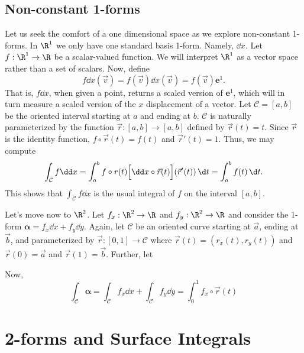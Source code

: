 \subsection{Non-constant 1-forms}

Let us seek the comfort of a one dimensional space as we explore non-constant 1-forms.
In $\R^1$ we only have one standard basis 1-form.  Namely, $\dd x$.
Let $f:\R^1\to\R$ be a scalar-valued function.  We will interpret
$\R^1$ as a vector space rather than a set of scalars. Now, define
\[
	f\dd x (\vec v) = f(\vec v)\dd x(\vec v) = f(\vec v)\bm e^1.
\]
That is, $f\dd x$, when given a point, returns a scaled version of $\bm e^1$,
which will in turn measure a scaled version of the $x$ displacement of
a vector.  Let $\mathcal C=[a,b]$ be the oriented interval starting
at $a$ and ending at $b$.  $\mathcal C$ is naturally parameterized
by the function $\vec r:[a,b]\to[a,b]$ defined by $\vec r(t) = t$.
Since $\vec r$ is the identity function, $f\circ \vec r(t)=f(t)$ and
$\vec r'(t) = 1$.
Thus, we may compute
\[
	\int_{\mathcal C} f\dd x = \int_a^b f\circ r(t) 
	\Big[\dd x \circ \vec r(t)\Big](\vec r'(t))\,\d t
	=\int_a^b f(t)\,\d t.
\]
This shows that
$\int_{\mathcal C} f\dd x$ is the usual integral of $f$ on the interval $[a,b]$.

\bigskip
Let's move now to $\R^2$.  Let $f_x:\R^2\to\R$ and $f_y:\R^2\to\R$
and consider the 1-form $\bm\alpha = f_x\dd x+f_y\dd y$.  Again, let
$\mathcal C$ be an oriented curve starting at $\vec a$, ending at $\vec b$,
and parameterized by $\vec r:[0,1]\to\mathcal C$  where
$\vec r(t) = (r_x(t),r_y(t))$ and  $\vec r(0)=\vec a$ and
$\vec r(1)=\vec b$.  Further, let

Now,
\[
	\int_{\mathcal C} \bm\alpha = 
	\int_{\mathcal C} f_x\dd x+\int_{\mathcal C} f_y\dd y
	=\int_0^1 f_x\circ \vec r(t)
\]

\section{2-forms and Surface Integrals}
